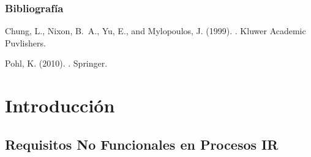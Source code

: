 \documentclass[handout,a4paper,slidestop,xcolor=pst,dvips,blue]{beamer}
\begin{document}
\begin{frame}[c]
    \frametitle{Bibliografía}
    \begin{thebibliography}{}
        Chung, L., Nixon, B.~A., Yu, E., and Mylopoulos, J. (1999).
        .
        \newblock Kluwer Academic Puvlishers.

        Pohl, K. (2010).
        .
        \newblock Springer.


    \end{thebibliography}
\end{frame}

\section{Introducción}

\subsection{Requisitos No Funcionales en Procesos IR}
\end{document}
